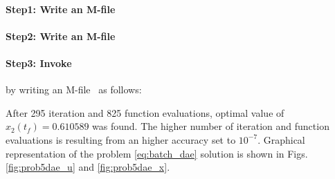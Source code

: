 \paragraph{Step1: Write an M-file~}

{\small }

\paragraph{Step2: Write an M-file~}

{\small }

\paragraph{Step3: Invoke~} by writing an
M-file~ as follows:

{\small }

After 295 iteration and 825 function evaluations, optimal value of
$x_{2}(t_{f}) = 0.610589$ was found. The higher number of iteration
and function evaluations is resulting from an higher accuracy set to
$10^{-7}$. Graphical representation of the problem
\eqref{eq:batch_dae} solution is shown in Figs. \ref{fig:prob5dae_u}
and \ref{fig:prob5dae_x}. 

